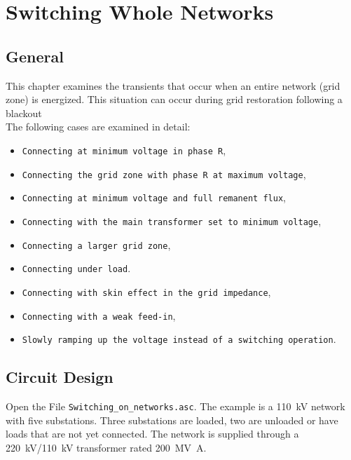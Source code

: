 \chapter{Switching Whole Networks}
\label{chap:switching-whole-networks}

\section{General}
\label{sec:whole-network-general}

This chapter examines the transients that occur when an entire network (grid zone) is energized. This situation can occur during grid restoration following a blackout\\ 
The following cases are examined in detail:\\
\begin{itemize}
	\item \texttt{Connecting at minimum voltage in phase R},
	\item \texttt{Connecting the grid zone with phase R at maximum voltage},
	\item \texttt{Connecting at minimum voltage and full remanent flux},
	\item \texttt{Connecting with the main transformer set to minimum voltage},
	
	\item \texttt{Connecting a larger grid zone},
	\item \texttt{Connecting under load}.
	\item \texttt{Connecting with skin effect in the grid impedance},
	\item \texttt{Connecting with a weak feed-in},
	\item \texttt{Slowly ramping up the voltage instead of a switching operation}.
\end{itemize}

\section{Circuit Design}
Open the File \texttt{Switching\_on\_networks.asc}.
The example is a \SI{110}{\kilo\volt} network with five substations.
Three substations are loaded, two are unloaded or have loads that are not yet
connected. The network is supplied through a
\SI{220}{\kilo\volt}/\SI{110}{\kilo\volt} transformer rated
\SI{200}{\mega\volt\ampere}.

